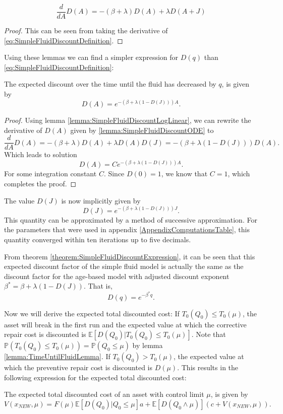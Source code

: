 \begin{lemma}\label{lemma:SimpleFluidDiscountODE}
	$$\frac{d}{dA}D(A)=-(\beta+\lambda)D(A)+\lambda D(A+J)$$
	\begin{proof}
		This can be seen from taking the derivative of \eqref{eq:SimpleFluidDiscountDefinition}.
	\end{proof}
\end{lemma}
Using these lemmas we can find a simpler expression for $D(q)$ than \eqref{eq:SimpleFluidDiscountDefinition}:
\begin{theorem}\label{theorem:SimpleFluidDiscountExpression}
	The expected discount over the time until the fluid has decreased by $q$, is given by
	\[
	D(A)=e^{-(\beta+\lambda(1-D(J)))A}.
	\]
	\begin{proof}
		Using lemma \ref{lemma:SimpleFluidDiscountLogLinear}, we can rewrite the derivative of $D(A)$ given by \ref{lemma:SimpleFluidDiscountODE} to
		\[
		\frac{d}{dA}D(A)=-(\beta+\lambda)D(A)+\lambda D(A)D(J)=-(\beta+\lambda(1-D(J)))D(A).
		\]
		Which leads to solution
		\[
		D(A)=Ce^{-(\beta+\lambda(1-D(J)))A}.
		\]
		For some integration constant $C$. Since $D(0)=1$, we know that $C=1$, which completes the proof.
	\end{proof}
\end{theorem}
\begin{corollary}
	The value $D(J)$ is now implicitly given by
	\[
	D(J)=e^{-(\beta+\lambda(1-D(J)))J}.
	\]
	This quantity can be approximated by a method of successive approximation.
	For the parameters that were used in appendix \ref{AppendixComputationsTable}, this quantity converged within ten iterations up to five decimals.
\end{corollary}
\begin{remark}\label{remark:SimpleFluidDiscountEquivalence}
	From theorem \ref{theorem:SimpleFluidDiscountExpression}, it can be seen that this expected discount factor of the simple fluid model is actually the same as the discount factor for the age-based model with adjusted discount exponent $\beta^*=\beta+\lambda(1-D(J))$.
	That is,
	\[
	D(q)=e^{-\beta^*q}.
	\]
\end{remark}

Now we will derive the expected total discounted cost:
If $T_0(Q_0)\leq T_0(\mu)$, the asset will break in the first run and the expected value at which the corrective repair cost is discounted is $\mathbb{E}[D(Q_0)|T_0(Q_0)\leq T_0(\mu)]$.
Note that $\mathbb{P}(T_0(Q_0)\leq T_0(\mu))=\mathbb{P}(Q_0\leq\mu)$ by lemma \ref{lemma:TimeUntilFluidLemma}.
If $T_0(Q_0)> T_0(\mu)$, the expected value at which the preventive repair cost is discounted is $D(\mu)$.
This results in the following expression for the expected total discounted cost:
\begin{theorem}
	The expected total discounted cost of an asset with control limit $\mu$, is given by
	\begin{equation}\label{eq:SimpleFluidImplicitTDC}
	V(x_{NEW},\mu)=F(\mu)\mathbb{E}[D(Q_0)|Q_0\leq \mu]a+\mathbb{E}[D(Q_0\wedge\mu)](c+V(x_{NEW},\mu)).
	\end{equation}
\end{theorem}

